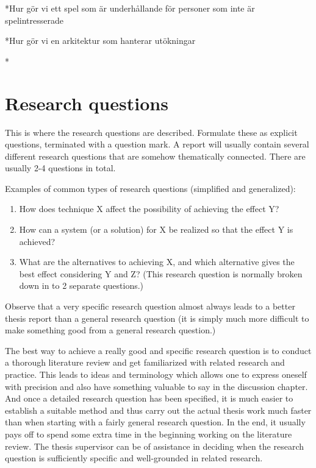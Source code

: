 *Hur gör vi ett spel som är underhållande för personer som inte är spelintresserade

*Hur gör vi en arkitektur som hanterar utökningar

*


\section{Research questions}
\label{sec:research-questions}


This is where the research questions are described.
Formulate these as explicit questions, terminated with a
question mark. A report will usually contain several different
research questions that are somehow thematically connected.
There are usually 2-4 questions in total.

Examples of common types of research questions (simplified
and generalized):

\begin{enumerate}
\item How does technique X affect the possibility of achieving the
  effect Y?

\item How can a system (or a solution) for X be realized so
  that the effect Y is achieved?

\item What are the alternatives to
  achieving X, and which alternative gives the best effect considering
  Y and Z? (This research question is normally broken down in to 2
  separate questions.)

\end{enumerate}


Observe that a very specific research question almost always
leads to a better thesis report than a general research question
(it is simply much more difficult to make something good
from a general research question.)

The best way to achieve a really good and specific research
question is to conduct a thorough literature review and get
familiarized with related research and practice. This leads to
ideas and terminology which allows one to express oneself
with precision and also have something valuable to say in the
discussion chapter. And once a detailed research question
has been specified, it is much easier to establish a suitable
method and thus carry out the actual thesis work much faster
than when starting with a fairly general research question. In
the end, it usually pays off to spend some extra time in the
beginning working on the literature review. The thesis
supervisor can be of assistance in deciding when the research
question is sufficiently specific and well-grounded in related
research.

